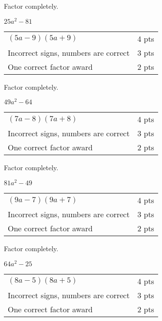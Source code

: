 {
	Factor completely.\par
	$25a^2-81$
}
{
	\begin{tabular}{l r}
	$(5a-9)(5a+9)$ & 4 pts\\
	Incorrect signs, numbers are correct & 3 pts \\
	One correct factor award & 2 pts 
	\end{tabular}
}

{
	Factor completely.\par
	$49a^2-64$
}
{
	\begin{tabular}{l r}
	$(7a-8)(7a+8)$ & 4 pts\\
	Incorrect signs, numbers are correct & 3 pts \\
	One correct factor award & 2 pts 
	\end{tabular}
}

{
	Factor completely.\par
	$81a^2-49$
}
{
	\begin{tabular}{l r}
	$(9a-7)(9a+7)$ & 4 pts\\
	Incorrect signs, numbers are correct & 3 pts \\
	One correct factor award & 2 pts 
	\end{tabular}
}

{
	Factor completely.\par
	$64a^2-25$
}
{
	\begin{tabular}{l r}
	$(8a-5)(8a+5)$ & 4 pts\\
	Incorrect signs, numbers are correct & 3 pts \\
	One correct factor award & 2 pts 
	\end{tabular}
}
